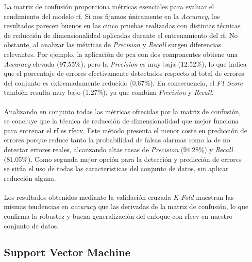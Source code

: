 La matriz de confusión proporciona métricas esenciales para evaluar el rendimiento del modelo \gls{rf}. Si nos fijamos únicamente en la \textit{Accuracy}, los resultados parecen buenos en las cinco pruebas realizadas con distintas técnicas de reducción de dimensionalidad aplicadas durante el entrenamiento del \gls{rf}. No obstante, al analizar las métricas de \textit{Precision} y \textit{Recall} surgen diferencias relevantes. Por ejemplo, la aplicación de \gls{pca} con dos componentes obtiene una \textit{Accuracy} elevada (97.55\%), pero la \textit{Precision} es muy baja (12.52\%), lo que indica que el porcentaje de errores efectivamente detectados respecto al total de errores del conjunto es extremadamente reducido (0.67\%). En consecuencia, el \textit{F1 Score} también resulta muy bajo (1.27\%), ya que combina \textit{Precision} y \textit{Recall}.\\
\\
Analizando en conjunto todas las métricas ofrecidas por la matriz de confusión, se concluye que la técnica de reducción de dimensionalidad que mejor funciona para entrenar el \gls{rf} es \gls{rfecv}. Este método presenta el menor coste en predicción de errores porque reduce tanto la probabilidad de falsas alarmas como la de no detectar errores reales, alcanzando altas tasas de \textit{Precision} (94.28\%) y \textit{Recall} (81.05\%). Como segunda mejor opción para la detección y predicción de errores se sitúa el uso de todas las características del conjunto de datos, sin aplicar reducción alguna.\\
\\
Los resultados obtenidos mediante la validación cruzada \textit{K-Fold} muestran las mismas tendencias en \textit{accuracy} que las derivadas de la matriz de confusión, lo que confirma la robustez y buena generalización del enfoque con \gls{rfecv} en nuestro conjunto de datos.

\subsection{Support Vector Machine} 


